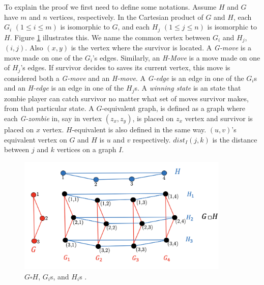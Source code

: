 \documentclass[1p]{elsarticle}
\begin{document}
To explain the proof we first need to define some notations. Assume $H$ and $G$ have $m$ and $n$ vertices, respectively.
In the Cartesian product of $G$ and $H$, each $G_{i}$  $(1 \leq i \leq m)$ is isomorphic to $G$, and each $H_{j}$ $(1
\leq j \leq n)$ is isomorphic to $H$. Figure \ref{fig:p1} illustrates this. We name the common vertex between $G_{i}$
and $H_{j}$, $(i,j)$. Also $(x,y)$ is the vertex where the survivor is located. A {\it G-move} is a move made on one of
the $G_{i}$'s edges.  Similarly, an {\it H-Move} is a move made on one of $H_{j}$'s edges. If survivor decides to saves
its current vertex, this move is considered both a {\it G-move} and an {\it H-move}. A {\it G-edge} is an edge in one of
the $G_{i}$s and an {\it H-edge} is an edge in one of the $H_{j}$s. A {\it winning state} is an state that zombie player
can catch survivor no matter what set of moves survivor makes, from that particular state. A $G$-equivalent graph, is
defined as a graph where each {\it G-zombie} in, say in vertex $(z_x,z_y)$, is placed on $z_x$ vertex and survivor is placed on
$x$ vertex. $H$-equivalent is also defined in the same way. $(u,v)$'s equivalent vertex on $G$ and $H$ is $u$ and $v$ respectively.
$dist_I(j,k)$ is the distance between $j$ and $k$ vertices on a graph $I$.
\begin{figure}[h!]
	\centering
	\includegraphics[width=0.9\textwidth]{fig/cp3.png}
	\caption{$G \square H$, $G_i$s, and $H_i$s .}
	\label{fig:p1}
\end{figure}
\end{document}
